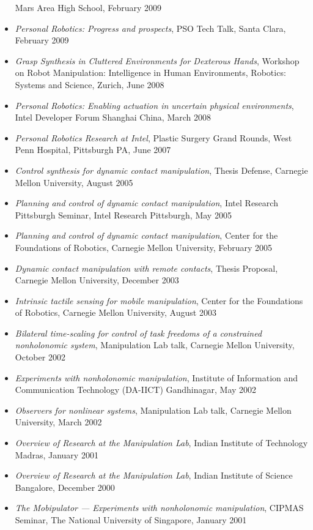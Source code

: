 \begin{itemize}
Mars Area High School, February 2009
\item \textit{Personal Robotics: Progress and prospects},
PSO Tech Talk, Santa Clara, February 2009
\item \textit{Grasp Synthesis in Cluttered Environments for Dexterous Hands},
Workshop on Robot Manipulation: Intelligence in Human Environments,
Robotics: Systems and Science, Zurich, June 2008
\item \textit{Personal Robotics: Enabling actuation in uncertain physical environments},
Intel Developer Forum Shanghai China, March 2008
\item \textit{Personal Robotics Research at Intel},
Plastic Surgery Grand Rounds, West Penn Hospital, Pittsburgh PA, June 2007
\item \textit{Control synthesis for dynamic contact manipulation},
Thesis Defense,  Carnegie Mellon University, August 2005
\item \textit{Planning and control of dynamic contact manipulation},
Intel Research Pittsburgh Seminar, Intel Research Pittsburgh, May 2005
\item \textit{Planning and control of dynamic contact manipulation},
Center for the Foundations of Robotics,  Carnegie Mellon University, February 2005
\item \textit{Dynamic contact manipulation with remote contacts},
Thesis Proposal,  Carnegie Mellon University, December 2003
\item \textit{Intrinsic tactile sensing for mobile manipulation},
Center for the Foundations of Robotics,  Carnegie Mellon University, August 2003
\item \textit{Bilateral time-scaling for control of task freedoms of a constrained nonholonomic system},
Manipulation Lab talk, Carnegie Mellon University, October 2002
\item \textit{Experiments with nonholonomic manipulation},
Institute of Information and Communication Technology (DA-IICT) Gandhinagar, May 2002
\item \textit{Observers for nonlinear systems},
Manipulation Lab talk, Carnegie Mellon University, March 2002
\item \textit{Overview of Research at the Manipulation Lab},
Indian Institute of Technology Madras, January 2001
\item \textit{Overview of Research at the Manipulation Lab},
Indian Institute of Science Bangalore, December 2000
\item \textit{The Mobipulator ---  Experiments with nonholonomic manipulation},
CIPMAS Seminar, The National University of Singapore, January 2001

\end{itemize}


